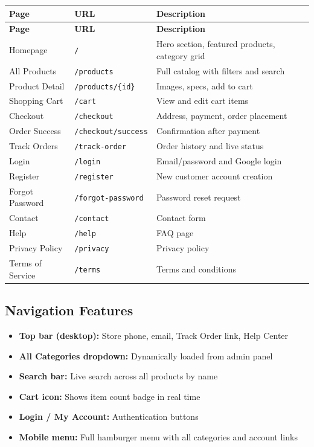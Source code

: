 \documentclass[12pt,a4paper]{article}
\begin{document}
\begin{longtable}{@{}L{3.5cm} L{4cm} L{6cm}@{}}
\toprule
\textbf{Page} & \textbf{URL} & \textbf{Description} \\
\midrule
\endfirsthead
\toprule
\textbf{Page} & \textbf{URL} & \textbf{Description} \\
\midrule
\endhead
Homepage & \texttt{/} & Hero section, featured products, category grid \\[4pt]
All Products & \texttt{/products} & Full catalog with filters and search \\[4pt]
Product Detail & \texttt{/products/\{id\}} & Images, specs, add to cart \\[4pt]
Shopping Cart & \texttt{/cart} & View and edit cart items \\[4pt]
Checkout & \texttt{/checkout} & Address, payment, order placement \\[4pt]
Order Success & \texttt{/checkout/success} & Confirmation after payment \\[4pt]
Track Orders & \texttt{/track-order} & Order history and live status \\[4pt]
Login & \texttt{/login} & Email/password and Google login \\[4pt]
Register & \texttt{/register} & New customer account creation \\[4pt]
Forgot Password & \texttt{/forgot-password} & Password reset request \\[4pt]
Contact & \texttt{/contact} & Contact form \\[4pt]
Help & \texttt{/help} & FAQ page \\[4pt]
Privacy Policy & \texttt{/privacy} & Privacy policy \\[4pt]
Terms of Service & \texttt{/terms} & Terms and conditions \\
\bottomrule
\end{longtable}

\subsection{Navigation Features}

\begin{itemize}[leftmargin=1.5em, itemsep=4pt]
  \item \textbf{Top bar (desktop):} Store phone, email, Track Order link, Help Center
  \item \textbf{All Categories dropdown:} Dynamically loaded from admin panel
  \item \textbf{Search bar:} Live search across all products by name
  \item \textbf{Cart icon:} Shows item count badge in real time
  \item \textbf{Login / My Account:} Authentication buttons
  \item \textbf{Mobile menu:} Full hamburger menu with all categories and account links
\end{itemize}
\end{document}
